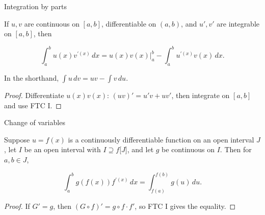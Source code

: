 \begin{theorem}{Integration by parts}

If \(u,v\) are continuous on \(\left\lbrack {a,b} \right\rbrack\), differentiable on \(\left( {a,b} \right)\), and \(u',v'\) are integrable on \(\left\lbrack {a,b} \right\rbrack\), then

\[\int_{a}^{b}u(x)v^{'{(x)}}\, dx = u(x)v(x)|_{a}^{b} - \int_{a}^{b}u^{'{(x)}}v(x)\, dx.\]

In the shorthand, \(\int u\, dv = uv - \int v\, du\).

\end{theorem}

\begin{proof}

Differentiate \(u(x)v(x)\): \(\left( {uv} \right)' = u'v + uv'\), then integrate on \(\left\lbrack {a,b} \right\rbrack\) and use FTC I.

\end{proof}

\begin{theorem}{Change of variables}

Suppose \(u = f(x)\) is a continuously differentiable function on an open interval \(J\), let \(I\) be an open interval with \(I \supseteq f\lbrack J\rbrack\), and let \(g\) be continuous on \(I\). Then for \(a,b \in J\),

\[\int_{a}^{b}g\left( {f(x)} \right)f^{'{(x)}}\, dx = \int_{f{(a)}}^{f{(b)}}g(u)\, du.\]

\end{theorem}

\begin{proof}

If \(G' = g\), then \(\left( {G \circ f} \right)' = g \circ f \cdot f'\), so FTC I gives the equality.

\end{proof}
